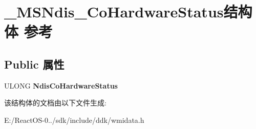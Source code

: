 \hypertarget{struct___m_s_ndis___co_hardware_status}{}\section{\+\_\+\+M\+S\+Ndis\+\_\+\+Co\+Hardware\+Status结构体 参考}
\label{struct___m_s_ndis___co_hardware_status}
\subsection*{Public 属性}
\begin{DoxyCompactItemize}
\item 
\mbox{\label{struct___m_s_ndis___co_hardware_status_af4c361b0a3e2d41523d77cb97bb824d0}} 
U\+L\+O\+NG {\bfseries Ndis\+Co\+Hardware\+Status}
\end{DoxyCompactItemize}


该结构体的文档由以下文件生成\+:\begin{DoxyCompactItemize}
\item 
E\+:/\+React\+O\+S-\/0../sdk/include/ddk/wmidata.\+h\end{DoxyCompactItemize}
